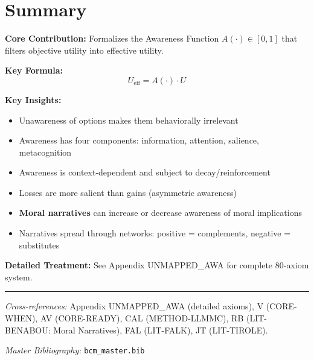 \section{Summary}

\begin{tcolorbox}[colback=gray!5!white, colframe=gray!75!black,
    title=Appendix UNMAPPED_AU Summary: CORE-AWARE]

\textbf{Core Contribution:}
Formalizes the Awareness Function $A(\cdot) \in [0, 1]$ that filters objective
utility into effective utility.

\textbf{Key Formula:}
\begin{equation}
U_{\text{eff}} = A(\cdot) \cdot U
\end{equation}

\textbf{Key Insights:}
\begin{itemize}[nosep]
\item Unawareness of options makes them behaviorally irrelevant
\item Awareness has four components: information, attention, salience, metacognition
\item Awareness is context-dependent and subject to decay/reinforcement
\item Losses are more salient than gains (asymmetric awareness)
\item \textbf{Moral narratives} can increase or decrease awareness of moral implications
\item Narratives spread through networks: positive = complements, negative = substitutes
\end{itemize}

\textbf{Detailed Treatment:} See Appendix UNMAPPED_AWA for complete 80-axiom system.

\end{tcolorbox}

\vspace{1em}
\hrule
\vspace{0.5em}

\noindent\textit{Cross-references:}
Appendix UNMAPPED_AWA (detailed axioms), V (CORE-WHEN), AV (CORE-READY), CAL (METHOD-LLMMC), RB (LIT-BENABOU: Moral Narratives), FAL (LIT-FALK), JT (LIT-TIROLE).

\noindent\textit{Master Bibliography:} \texttt{bcm\_master.bib}

\nocite{bcm_master}

